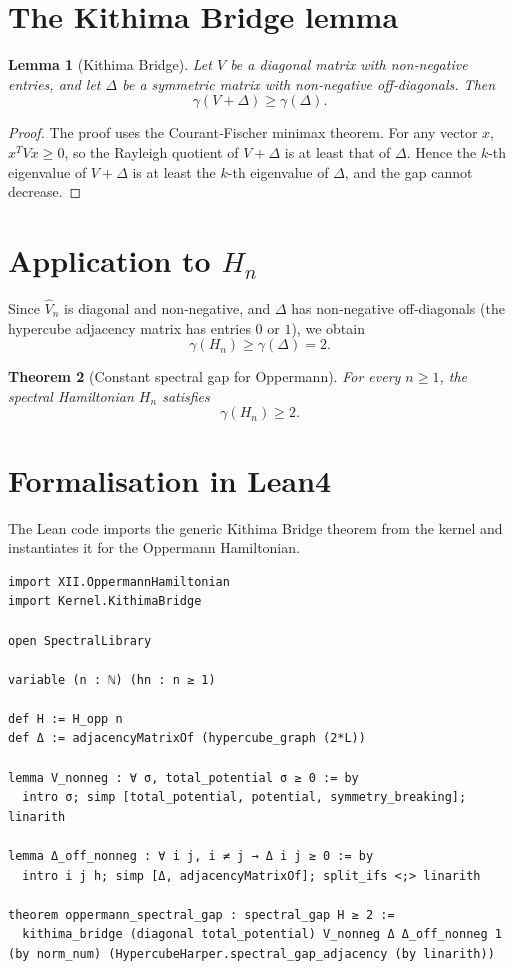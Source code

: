 \documentclass[11pt,a4paper]{article}
\newtheorem{theorem}{Theorem}[section]
\newtheorem{lemma}[theorem]{Lemma}
\begin{document}
\section{The Kithima Bridge lemma}

\begin{lemma}[Kithima Bridge]
Let $V$ be a diagonal matrix with non‑negative entries, and let $\Delta$ be a symmetric matrix with non‑negative off‑diagonals. Then
\[
\gamma(V + \Delta) \ge \gamma(\Delta).
\]
\end{lemma}
\begin{proof}
The proof uses the Courant‑Fischer minimax theorem. For any vector $x$, $x^T V x \ge 0$, so the Rayleigh quotient of $V+\Delta$ is at least that of $\Delta$. Hence the $k$-th eigenvalue of $V+\Delta$ is at least the $k$-th eigenvalue of $\Delta$, and the gap cannot decrease.
\end{proof}

\section{Application to $H_n$}

Since $\hat{V}_n$ is diagonal and non‑negative, and $\Delta$ has non‑negative off‑diagonals (the hypercube adjacency matrix has entries $0$ or $1$), we obtain
\[
\gamma(H_n) \ge \gamma(\Delta) = 2.
\]

\begin{theorem}[Constant spectral gap for Oppermann]
For every $n\ge 1$, the spectral Hamiltonian $H_n$ satisfies
\[
\gamma(H_n) \ge 2.
\]
\end{theorem}

\section{Formalisation in Lean4}

The Lean code imports the generic Kithima Bridge theorem from the kernel and instantiates it for the Oppermann Hamiltonian.

\begin{lstlisting}[style=lean, caption={SeriesXII/OppermannGap.lean (excerpt)}]
import XII.OppermannHamiltonian
import Kernel.KithimaBridge

open SpectralLibrary

variable (n : ℕ) (hn : n ≥ 1)

def H := H_opp n
def Δ := adjacencyMatrixOf (hypercube_graph (2*L))

lemma V_nonneg : ∀ σ, total_potential σ ≥ 0 := by
  intro σ; simp [total_potential, potential, symmetry_breaking]; linarith

lemma Δ_off_nonneg : ∀ i j, i ≠ j → Δ i j ≥ 0 := by
  intro i j h; simp [Δ, adjacencyMatrixOf]; split_ifs <;> linarith

theorem oppermann_spectral_gap : spectral_gap H ≥ 2 :=
  kithima_bridge (diagonal total_potential) V_nonneg Δ Δ_off_nonneg 1 (by norm_num) (HypercubeHarper.spectral_gap_adjacency (by linarith))
\end{lstlisting}
\end{document}
